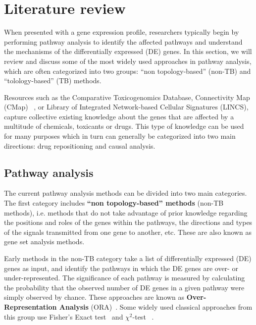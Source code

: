 \section{Literature review}


When presented with a gene expression profile, researchers typically begin by performing pathway analysis to identify the affected pathways and understand the mechanisms of the differentially expressed (DE) genes. In this section, we will review and discuss some of the most widely used approaches in pathway analysis, which are often categorized into two groups: ``non topology-based''  (non-TB) and ``tolology-based'' (TB) methods.

Resources such as the Comparative Toxicogenomics Database, Connectivity Map (CMap) ~\cite{lamb2007connectivity, lamb2006connectivity}, or Library of Integrated Network-based Cellular Signatures (LINCS), capture collective existing knowledge about the genes that are affected by a multitude of  chemicals, toxicants or drugs. This type of knowledge can be used for many purposes which in turn can generally be categorized into two main directions: drug repositioning and causal analysis.



\subsection{Pathway analysis}
The current pathway analysis methods can be divided into two main categories. 
The first category includes \textbf{``non topology-based'' methods} (non-TB methods), i.e. methods  that do not take advantage of prior knowledge regarding the positions and roles of the genes within the pathways, the directions and types of the signals transmitted from one gene to another, etc.  
These are also known as gene set analysis methods. 

Early methods in the non-TB category take a list of differentially expressed (DE) genes as input, and identify the pathways in which the DE genes are over- or under-represented.
The significance of each pathway is measured by calculating the probability that the observed number of DE genes in a given pathway were simply observed by chance. 
These approaches are known as \textbf{Over-Representation Analysis} (ORA)~\cite{khatri2005comparison, goeman2007analyzing}.
Some widely used classical approaches from this group use Fisher's Exact test~\cite{Fisher:1951} and $\chi^2$-test ~\cite{Fisher:1993}. 

